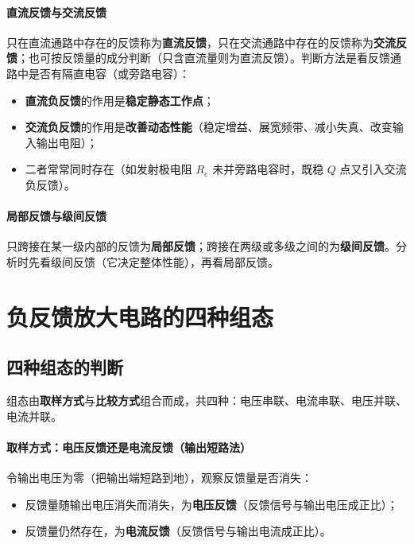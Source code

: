 \paragraph{直流反馈与交流反馈}
只在直流通路中存在的反馈称为\textbf{直流反馈}，只在交流通路中存在的反馈称为\textbf{交流反馈}；也可按反馈量的成分判断（只含直流量则为直流反馈）。判断方法是看反馈通路中是否有隔直电容（或旁路电容）：
\begin{itemize}
    \item \textbf{直流负反馈}的作用是\textbf{稳定静态工作点}；
    \item \textbf{交流负反馈}的作用是\textbf{改善动态性能}（稳定增益、展宽频带、减小失真、改变输入输出电阻）；
    \item 二者常常同时存在（如发射极电阻 $R_e$ 未并旁路电容时，既稳 $Q$ 点又引入交流负反馈）。
\end{itemize}

\paragraph{局部反馈与级间反馈}
只跨接在某一级内部的反馈为\textbf{局部反馈}；跨接在两级或多级之间的为\textbf{级间反馈}。分析时先看级间反馈（它决定整体性能），再看局部反馈。

\section{负反馈放大电路的四种组态}

\subsection{四种组态的判断}

组态由\textbf{取样方式}与\textbf{比较方式}组合而成，共四种：电压串联、电流串联、电压并联、电流并联。

\paragraph{取样方式：电压反馈还是电流反馈（输出短路法）}
令输出电压为零（把输出端短路到地），观察反馈量是否消失：
\begin{itemize}
    \item 反馈量随输出电压消失而消失，为\textbf{电压反馈}（反馈信号与输出电压成正比）；
    \item 反馈量仍然存在，为\textbf{电流反馈}（反馈信号与输出电流成正比）。
\end{itemize}

